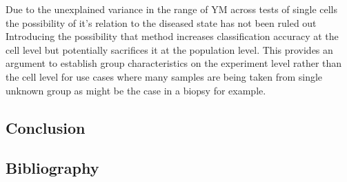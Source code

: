 \documentclass[
  paper=a4,
  ,captions=tableheading
]{scrartcl}
\begin{document}
Due to the unexplained variance in the range of YM across tests of
single cells the possibility of it's relation to the diseased state has
not been ruled out Introducing the possibility that method increases
classification accuracy at the cell level but potentially sacrifices it
at the population level. This provides an argument to establish group
characteristics on the experiment level rather than the cell level for
use cases where many samples are being taken from single unknown group
as might be the case in a biopsy for example.

\subsection{Conclusion}\label{conclusion}

\subsection*{Bibliography}\label{bibliography}
\end{document}
